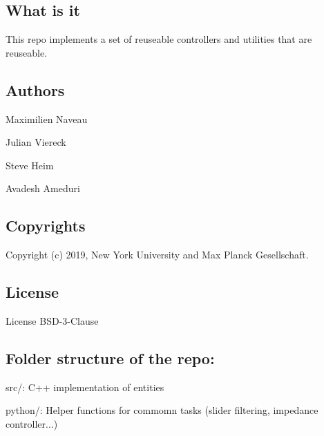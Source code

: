 \subsection*{What is it}

This repo implements a set of reuseable controllers and utilities that are reuseable.

\subsection*{Authors}


\begin{DoxyItemize}
\item Maximilien Naveau
\item Julian Viereck
\item Steve Heim
\item Avadesh Ameduri
\end{DoxyItemize}

\subsection*{Copyrights}

Copyright (c) 2019, New York University and Max Planck Gesellschaft.

\subsection*{License}

License B\+S\+D-\/3-\/\+Clause

\subsection*{Folder structure of the repo\+:}


\begin{DoxyItemize}
\item {\ttfamily src/}\+: C++ implementation of entities
\item {\ttfamily python/}\+: Helper functions for commomn tasks (slider filtering, impedance controller...) 
\end{DoxyItemize}